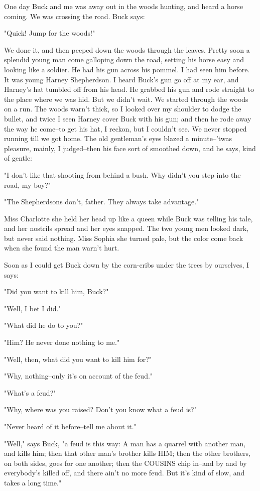 One day Buck and me was away out in the woods hunting, and heard a horse
coming.  We was crossing the road.  Buck says:

"Quick!  Jump for the woods!"

We done it, and then peeped down the woods through the leaves.  Pretty
soon a splendid young man come galloping down the road, setting his horse
easy and looking like a soldier.  He had his gun across his pommel.  I
had seen him before.  It was young Harney Shepherdson.  I heard Buck's
gun go off at my ear, and Harney's hat tumbled off from his head.  He
grabbed his gun and rode straight to the place where we was hid.  But we
didn't wait.  We started through the woods on a run.  The woods warn't
thick, so I looked over my shoulder to dodge the bullet, and twice I seen
Harney cover Buck with his gun; and then he rode away the way he come--to
get his hat, I reckon, but I couldn't see.  We never stopped running till
we got home.  The old gentleman's eyes blazed a minute--'twas pleasure,
mainly, I judged--then his face sort of smoothed down, and he says,
kind of gentle:

"I don't like that shooting from behind a bush.  Why didn't you step into
the road, my boy?"

"The Shepherdsons don't, father.  They always take advantage."

Miss Charlotte she held her head up like a queen while Buck was telling
his tale, and her nostrils spread and her eyes snapped.  The two young
men looked dark, but never said nothing.  Miss Sophia she turned pale,
but the color come back when she found the man warn't hurt.

Soon as I could get Buck down by the corn-cribs under the trees by
ourselves, I says:

"Did you want to kill him, Buck?"

"Well, I bet I did."

"What did he do to you?"

"Him?  He never done nothing to me."

"Well, then, what did you want to kill him for?"

"Why, nothing--only it's on account of the feud."

"What's a feud?"

"Why, where was you raised?  Don't you know what a feud is?"

"Never heard of it before--tell me about it."

"Well," says Buck, "a feud is this way:  A man has a quarrel with another
man, and kills him; then that other man's brother kills HIM; then the
other brothers, on both sides, goes for one another; then the COUSINS
chip in--and by and by everybody's killed off, and there ain't no more
feud.  But it's kind of slow, and takes a long time."

